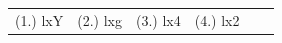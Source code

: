  \par \begin{tabular}[h]{cccccc}
 (1.) lxY  &  (2.) lxg  &  (3.) lx4  &  (4.) lx2  & \end{tabular}
% 
%     
%     
%     
%     
 \label{m39338*uid68}
